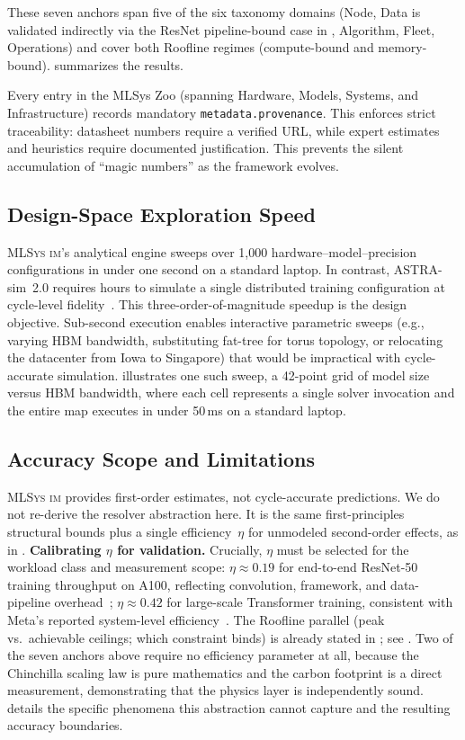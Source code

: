 \documentclass[10pt,twocolumn]{article}
\newcommand{\mlsysim}{\mbox{\textsc{MLSys}\,\textperiodcentered\,\textsc{im}}\xspace}
\begin{document}
These seven anchors span five of the six taxonomy domains (Node, Data is validated indirectly via the ResNet pipeline-bound case in , Algorithm, Fleet, Operations) and cover both Roofline regimes (compute-bound and memory-bound).  summarizes the results.

Every entry in the MLSys Zoo (spanning Hardware, Models, Systems, and Infrastructure) records mandatory \texttt{metadata.provenance}. This enforces strict traceability: datasheet numbers require a verified URL, while expert estimates and heuristics require documented justification. This prevents the silent accumulation of ``magic numbers'' as the framework evolves.

\subsection{Design-Space Exploration Speed}
\label{sec:validation-speed}

\mlsysim's analytical engine sweeps over 1,000 hardware--model--precision configurations in under one second on a standard laptop. In contrast, ASTRA-sim~2.0 requires hours to simulate a single distributed training configuration at cycle-level fidelity~\citep{won2023}. This three-order-of-magnitude speedup is the design objective. Sub-second execution enables interactive parametric sweeps (e.g., varying HBM bandwidth, substituting fat-tree for torus topology, or relocating the datacenter from Iowa to Singapore) that would be impractical with cycle-accurate simulation.  illustrates one such sweep, a 42-point grid of model size versus HBM bandwidth, where each cell represents a single solver invocation and the entire map executes in under 50\,ms on a standard laptop.

\subsection{Accuracy Scope and Limitations}
\label{sec:accuracy}

\mlsysim provides first-order estimates, not cycle-accurate predictions. We do not re-derive the resolver abstraction here. It is the same first-principles structural bounds plus a single efficiency~$\eta$ for unmodeled second-order effects, as in . \textbf{Calibrating $\eta$ for validation.} Crucially, $\eta$ must be selected for the workload class and measurement scope: $\eta \approx 0.19$ for end-to-end ResNet-50 training throughput on A100, reflecting convolution, framework, and data-pipeline overhead~\citep{mattson2020}; $\eta \approx 0.42$ for large-scale Transformer training, consistent with Meta's reported system-level efficiency~\citep{llama3team2024}. The Roofline parallel (peak vs.\ achievable ceilings; which constraint binds) is already stated in ; see \citet{williams2009}. Two of the seven anchors above require no efficiency parameter at all, because the Chinchilla scaling law is pure mathematics and the carbon footprint is a direct measurement, demonstrating that the physics layer is independently sound.  details the specific phenomena this abstraction cannot capture and the resulting accuracy boundaries.
\end{document}
